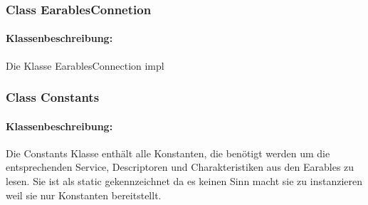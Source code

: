 \documentclass[a4paper,12pt]{article}
\begin{document}
\subsubsection{Class EarablesConnetion}

\paragraph{Klassenbeschreibung:}
Die Klasse EarablesConnection impl


\subsubsection{Class Constants}
\paragraph{Klassenbeschreibung:}
Die Constants Klasse enthält alle Konstanten, die benötigt werden um die entsprechenden Service, Descriptoren und Charakteristiken aus den Earables zu lesen. Sie ist als static gekennzeichnet da es keinen Sinn macht sie zu instanzieren weil sie nur Konstanten bereitstellt.
\end{document}
